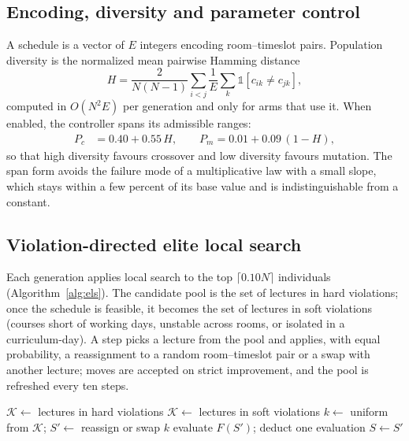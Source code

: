 \documentclass[journal]{IEEEtran}
\begin{document}
\subsection{Encoding, diversity and parameter control}
A schedule is a vector of $E$ integers encoding room--timeslot pairs. Population diversity is the normalized mean pairwise Hamming distance
\begin{equation}
H=\frac{2}{N(N-1)}\sum_{i<j}\frac{1}{E}\sum_{k}\mathbb{1}[c_{ik}\neq c_{jk}],
\end{equation}
computed in $O(N^2E)$ per generation and only for arms that use it. When enabled, the controller spans its admissible ranges:
\begin{align}
P_c &= 0.40+0.55\,H,\qquad P_m=0.01+0.09\,(1-H),
\end{align}
so that high diversity favours crossover and low diversity favours mutation. The span form avoids the failure mode of a multiplicative law with a small slope, which stays within a few percent of its base value and is indistinguishable from a constant.

\subsection{Violation-directed elite local search}
Each generation applies local search to the top $\lceil0.10N\rceil$ individuals (Algorithm~\ref{alg:els}). The candidate pool is the set of lectures in hard violations; once the schedule is feasible, it becomes the set of lectures in soft violations (courses short of working days, unstable across rooms, or isolated in a curriculum-day). A step picks a lecture from the pool and applies, with equal probability, a reassignment to a random room--timeslot pair or a swap with another lecture; moves are accepted on strict improvement, and the pool is refreshed every ten steps.

\begin{algorithm}[!t]
\caption{Violation-Directed Elite Local Search}
\label{alg:els}
\begin{algorithmic}[1]
            \State $\mathcal{K}\gets$ lectures in hard violations
             $\mathcal{K}\gets$ lectures in soft violations \EndIf
        \EndIf
        \State $k\gets$ uniform from $\mathcal{K}$; $S'\gets$ reassign or swap $k$
        \State evaluate $F(S')$; deduct one evaluation
         $S\gets S'$ \EndIf
    \EndFor
\EndFor
\end{algorithmic}
\end{algorithm}
\end{document}
